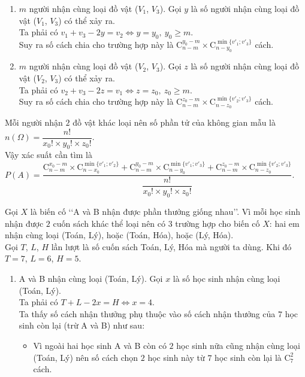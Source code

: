 \begin{vd}
{\begin{tongquat}
\begin{enumerate}[TH $1$.]
				Suy ra số cách chia cho trường hợp này là $\mathrm{C}^{x_0-m}_{n-m} \times \mathrm{C}^{\min\limits \{v'_1;v'_2\}}_{n-x_0}$ cách.
				\item $m$ người nhận cùng loại đồ vật ($V_1$, $V_3$). Gọi $y$ là số người nhận cùng loại đồ vật ($V_1$, $V_3$) có thể xảy ra.\\
				Ta phải có $v_1+v_3-2y=v_2 \Leftrightarrow y=y_0,~y_0 \ge m$.\\
				Suy ra số cách chia cho trường hợp này là $\mathrm{C}^{y_0-m}_{n-m} \times \mathrm{C}^{\min\limits \{v'_1;v'_3\}}_{n-y_0}$ cách.
				\item $m$ người nhận cùng loại đồ vật ($V_2$, $V_3$). Gọi $z$ là số người nhận cùng loại đồ vật ($V_2$, $V_3$) có thể xảy ra.\\
				Ta phải có $v_2+v_3-2z=v_1 \Leftrightarrow z=z_0,~z_0 \ge m$.\\
				Suy ra số cách chia cho trường hợp này là $\mathrm{C}^{z_0-m}_{n-m} \times \mathrm{C}^{\min\limits \{v'_2;v'_3\}}_{n-z_0}$ cách.
			\end{enumerate}	
			Mỗi người nhận $2$ đồ vật khác loại nên số phần tử của không gian mẫu là $n(\Omega)=\dfrac{n!}{x_0! \times y_0! \times z_0!}$.\\
			Vậy xác suất cần tìm là $P(A)=\dfrac{\mathrm{C}^{x_0-m}_{n-m} \times \mathrm{C}^{\min\limits \{v'_1;v'_2\}}_{n-x_0}+\mathrm{C}^{y_0-m}_{n-m} \times \mathrm{C}^{\min\limits \{v'_1;v'_3\}}_{n-y_0}+\mathrm{C}^{z_0-m}_{n-m} \times \mathrm{C}^{\min\limits \{v'_2;v'_3\}}_{n-z_0}}{\dfrac{n!}{x_0! \times y_0! \times z_0!}}$.
		\end{tongquat}
		\noindent
		Gọi $X$ là biến cố \lq \lq A và B nhận được phần thưởng giống nhau\rq \rq . Vì mỗi học sinh nhận được $2$ cuốn sách khác thể loại nên có $3$ trường hợp cho biến cố $X$: hai em nhận cùng loại (Toán, Lý), hoặc (Toán, Hóa), hoặc (Lý, Hóa).\\
		Gọi $T$, $L$, $H$ lần lượt là số cuốn sách Toán, Lý, Hóa mà người ta dùng. Khi đó $T=7$, $L=6$, $H=5$.
		\begin{enumerate}[TH $1$.]
			\item A và B nhận cùng loại (Toán, Lý). Gọi $x$ là số học sinh nhận cùng loại (Toán, Lý).\\
			Ta phải có $T+L-2x=H \Leftrightarrow x=4$.\\
			Ta thấy số cách nhận thưởng phụ thuộc vào số cách nhận thưởng của $7$ học sinh còn lại (trừ A và B) như sau:
			\begin{itemize}
				\item Vì ngoài hai học sinh A và B còn có $2$ học sinh nữa cũng nhận cùng loại (Toán, Lý) nên số cách chọn $2$ học sinh này từ $7$ học sinh còn lại là $\mathrm{C}^2_{7}$ cách.

\end{itemize}
\end{enumerate}}
\end{vd}
